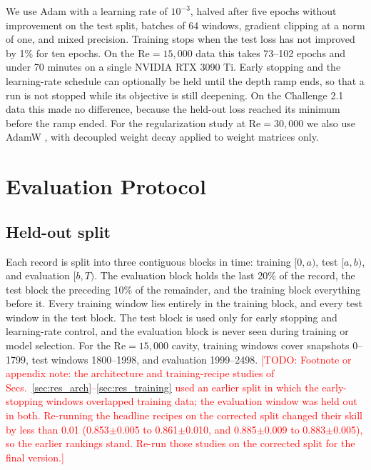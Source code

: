 \documentclass[conf]{new-aiaa}
\newcommand{\todo}[1]{\textcolor{red}{[TODO: #1]}}
\newcommand{\Rey}{\mathrm{Re}}
\begin{document}
We use Adam \cite{kingma2015adam} with a learning rate of $10^{-3}$, halved after five epochs without improvement on the test split, batches of 64 windows, gradient clipping at a norm of one, and mixed precision. Training stops when the test loss has not improved by 1\% for ten epochs. On the $\Rey=15{,}000$ data this takes 73--102 epochs and under 70 minutes on a single NVIDIA RTX 3090 Ti. Early stopping and the learning-rate schedule can optionally be held until the depth ramp ends, so that a run is not stopped while its objective is still deepening. On the Challenge 2.1 data this made no difference, because the held-out loss reached its minimum before the ramp ended. For the regularization study at $\Rey=30{,}000$ we also use AdamW \cite{loshchilov2019adamw}, with decoupled weight decay applied to weight matrices only.

\section{Evaluation Protocol}
\label{sec:eval}

\subsection{Held-out split}
Each record is split into three contiguous blocks in time: training $[0,a)$, test $[a,b)$, and evaluation $[b,T)$. The evaluation block holds the last 20\% of the record, the test block the preceding 10\% of the remainder, and the training block everything before it. Every training window lies entirely in the training block, and every test window in the test block. The test block is used only for early stopping and learning-rate control, and the evaluation block is never seen during training or model selection. For the $\Rey=15{,}000$ cavity, training windows cover snapshots 0--1799, test windows 1800--1998, and evaluation 1999--2498. \todo{Footnote or appendix note: the architecture and training-recipe studies of Secs.~\ref{sec:res_arch}--\ref{sec:res_training} used an earlier split in which the early-stopping windows overlapped training data; the evaluation window was held out in both. Re-running the headline recipes on the corrected split changed their skill by less than 0.01 (0.853$\pm$0.005 to 0.861$\pm$0.010, and 0.885$\pm$0.009 to 0.883$\pm$0.005), so the earlier rankings stand. Re-run those studies on the corrected split for the final version.}
\end{document}
